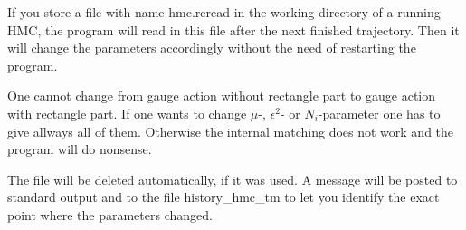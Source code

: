 If you store a file with name {\ttfamily hmc.reread} in the working
directory of a running HMC, the program will read in this file after
the next finished trajectory. Then it will change the parameters
accordingly without the need of restarting the program. 

One cannot change from gauge action without rectangle part to gauge
action with rectangle part. If one wants to change $\mu$-,
$\epsilon^2$- or $N_i$-parameter one has to give allways all of
them. Otherwise the internal matching does not work and the program
will do nonsense.

The file will be deleted automatically, if it was used. A message will
be posted to standard output and to the file {\ttfamily
  history\_hmc\_tm} to let you identify the exact point where the
parameters changed.

